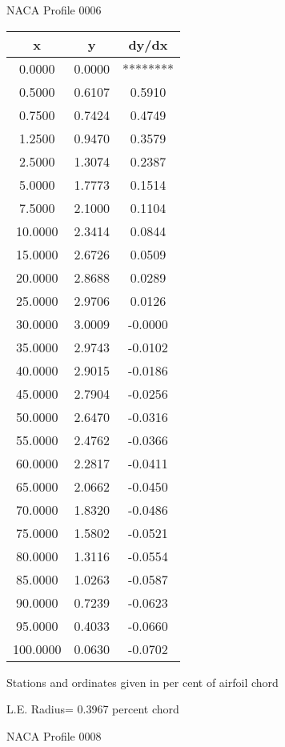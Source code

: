 \documentclass[11pt]{book}
\begin{document}
 \newpage
  \label{p0006}
 \begin{Large}
 NACA Profile 0006
 \end{Large}
  
 \vspace{8mm}
 \begin{tabular}{|c|c|c|} \hline 
  x  &  y  &  dy/dx \\
 \hline
0.0000 & 0.0000 & ******** \\
0.5000 & 0.6107 & 0.5910 \\
0.7500 & 0.7424 & 0.4749 \\
1.2500 & 0.9470 & 0.3579 \\
2.5000 & 1.3074 & 0.2387 \\
5.0000 & 1.7773 & 0.1514 \\
7.5000 & 2.1000 & 0.1104 \\
10.0000 & 2.3414 & 0.0844 \\
15.0000 & 2.6726 & 0.0509 \\
20.0000 & 2.8688 & 0.0289 \\
25.0000 & 2.9706 & 0.0126 \\
30.0000 & 3.0009 & -0.0000 \\
35.0000 & 2.9743 & -0.0102 \\
40.0000 & 2.9015 & -0.0186 \\
45.0000 & 2.7904 & -0.0256 \\
50.0000 & 2.6470 & -0.0316 \\
55.0000 & 2.4762 & -0.0366 \\
60.0000 & 2.2817 & -0.0411 \\
65.0000 & 2.0662 & -0.0450 \\
70.0000 & 1.8320 & -0.0486 \\
75.0000 & 1.5802 & -0.0521 \\
80.0000 & 1.3116 & -0.0554 \\
85.0000 & 1.0263 & -0.0587 \\
90.0000 & 0.7239 & -0.0623 \\
95.0000 & 0.4033 & -0.0660 \\
100.0000 & 0.0630 & -0.0702 \\
 \hline
 \end{tabular}
 \vspace{8mm}


Stations and ordinates given in per cent of airfoil chord 


L.E. Radius=  0.3967 percent chord
 \newpage
  \label{p0008}
 \begin{Large}
 NACA Profile 0008
 \end{Large}
  
\end{document}
